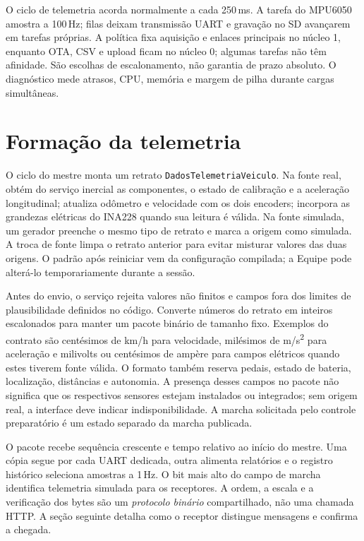 O ciclo de telemetria acorda normalmente a cada 250\,ms. A tarefa do MPU6050 amostra a 100\,Hz; filas deixam transmissão UART e gravação no SD avançarem em tarefas próprias. A política fixa aquisição e enlaces principais no núcleo 1, enquanto OTA, CSV e upload ficam no núcleo 0; algumas tarefas não têm afinidade. São escolhas de escalonamento, não garantia de prazo absoluto. O diagnóstico mede atrasos, CPU, memória e margem de pilha durante cargas simultâneas.

\section{Formação da telemetria}
O ciclo do mestre monta um retrato \texttt{DadosTelemetriaVeiculo}. Na fonte real, obtém do serviço inercial as componentes, o estado de calibração e a aceleração longitudinal; atualiza odômetro e velocidade com os dois encoders; incorpora as grandezas elétricas do INA228 quando sua leitura é válida. Na fonte simulada, um gerador preenche o mesmo tipo de retrato e marca a origem como simulada. A troca de fonte limpa o retrato anterior para evitar misturar valores das duas origens. O padrão após reiniciar vem da configuração compilada; a Equipe pode alterá-lo temporariamente durante a sessão.

Antes do envio, o serviço rejeita valores não finitos e campos fora dos limites de plausibilidade definidos no código. Converte números do retrato em inteiros escalonados para manter um pacote binário de tamanho fixo. Exemplos do contrato são centésimos de km/h para velocidade, milésimos de m/s\textsuperscript{2} para aceleração e milivolts ou centésimos de ampère para campos elétricos quando estes tiverem fonte válida. O formato também reserva pedais, estado de bateria, localização, distâncias e autonomia. A presença desses campos no pacote não significa que os respectivos sensores estejam instalados ou integrados; sem origem real, a interface deve indicar indisponibilidade. A marcha solicitada pelo controle preparatório é um estado separado da marcha publicada.

O pacote recebe sequência crescente e tempo relativo ao início do mestre. Uma cópia segue por cada UART dedicada, outra alimenta relatórios e o registro histórico seleciona amostras a 1\,Hz. O bit mais alto do campo de marcha identifica telemetria simulada para os receptores. A ordem, a escala e a verificação dos bytes são um \emph{protocolo binário} compartilhado, não uma chamada HTTP. A seção seguinte detalha como o receptor distingue mensagens e confirma a chegada.

